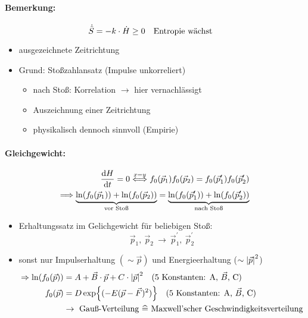 \paragraph{Bemerkung:}
\begin{equation}
    \Dot{\Tilde{S}} = -k \cdot \Dot{H} \geq 0 \qq{Entropie wächst}
\end{equation}
\begin{itemize}
    \item ausgezeichnete Zeitrichtung
    \item Grund: Stoßzahlansatz (Impulse unkorreliert)
    \begin{itemize}
        \item nach Stoß: Korrelation $\rightarrow$ hier vernachlässigt
        \item Auszeichnung einer Zeitrichtung
        \item physikalisch dennoch sinnvoll (Empirie)
    \end{itemize}
\end{itemize}

\paragraph{Gleichgewicht:}
\begin{align}
    \dv{H}{t} = 0 \stackrel{x=y}{\Longleftrightarrow} f_0(\Vec{p}_1) f_0(\Vec{p}_2) = f_0(\Vec{p}_1^\prime) f_0(\Vec{p}_2^\prime) \\
    \Longrightarrow \underbrace{\ln(f_0(\Vec{p}_1)) + \ln(f_0(\Vec{p}_2))}_{\text{vor Stoß}} = \underbrace{\ln(f_0(\Vec{p}_1^\prime)) + \ln(f_0(\Vec{p}_2^\prime))}_{\text{nach Stoß}}
\end{align}
\begin{itemize}
    \item Erhaltungssatz im Gelichgewicht für beliebigen Stoß:
    \begin{equation}
        \Vec{p}_1,\ \Vec{p}_2 \ \longrightarrow \ \Vec{p}_1^\prime,\ \Vec{p}_2^\prime
    \end{equation}
    \item sonst nur Impulserhaltung $(\sim \Vec{p})$ und Energieerhaltung ($\sim \abs{\Vec{p}}^2$)
    \begin{align}
        \Rightarrow \ln(f_0(\Vec{p})) &= A + \Vec{B}\cdot \Vec{p} + C \cdot \abs{\Vec{p}}^2 \qq{(5 Konstanten: A, $\Vec{B}$, C)} \\
        f_0(\Vec{p}) &= D \exp{(-E(\Vec{p}-\Vec{F})^2)} \qq{(5 Konstanten: A, $\Vec{B}$, C)}\\
        &\rightarrow \ \text{Gauß-Verteilung $\widehat{=}$ Maxwell'scher Geschwindigkeitsverteilung}
    \end{align}
\end{itemize}

